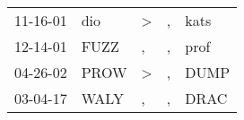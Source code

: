 \begin{supertabular}{lllll}
 11-16-01 &   dio &  \textgreater &  , &  kats \\
 12-14-01 &  FUZZ &             , &  , &  prof \\
 04-26-02 &  PROW &  \textgreater &  , &  DUMP \\
 03-04-17 &  WALY &             , &  , &  DRAC \\
\end{supertabular}
